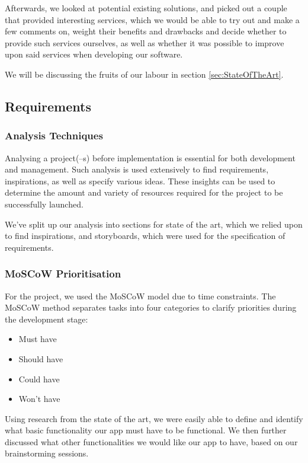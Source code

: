 \documentclass[12p]{article}
\begin{document}
	Afterwards, we looked at potential existing solutions, and picked out a couple that provided interesting services, which we would be able to try out and make a few comments on, weight their benefits and drawbacks and decide whether to provide such services ourselves, as well as whether it was possible to improve upon said services when developing our software.
	
	We will be discussing the fruits of our labour in section \ref{sec:StateOfTheArt}.
	
	\subsection{Requirements}
	
	\subsubsection{Analysis Techniques}
	
	Analysing a project(–s) before implementation is essential for both development and management. Such analysis is used extensively to find requirements, inspirations, as well as specify various ideas. These insights can be used to determine the amount and variety of resources required for the project to be successfully launched.
	
	We've split up our analysis into sections for state of the art, which we relied upon to find inspirations, and storyboards, which were used for the specification of requirements.
	
	\subsubsection{MoSCoW Prioritisation}
	
	For the project, we used the MoSCoW model due to time constraints. The MoSCoW method separates tasks into four categories to clarify priorities during the development stage:

    \begin{itemize}
        \item Must have
        \item Should have
        \item Could have
        \item Won't have
    \end{itemize}
    
    Using research from the state of the art, we were easily able to define and identify what basic functionality our app must have to be functional. We then further discussed what other functionalities we would like our app to have, based on our brainstorming sessions.
    
\end{document}
